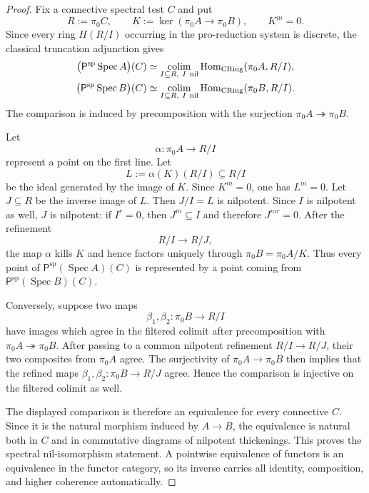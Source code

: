\begin{proof}
Fix a connective spectral test $C$ and put
\[
    R:=\pi_0C,
    \qquad
    K:=\ker(\pi_0A\to\pi_0B),
    \qquad
    K^m=0.
\]
Since every ring $H(R/I)$ occurring in the pro-reduction system is discrete,
the classical truncation adjunction gives
\[
\begin{aligned}
    \bigl(\mathsf P^{\mathrm{sp}}\operatorname{Spec}A\bigr)(C)
    &\simeq
    \operatorname*{colim}_{I\subseteq R,\ I\ {\rm nil}}
    \operatorname{Hom}_{\operatorname{CRing}}
    (\pi_0A,R/I),\\
    \bigl(\mathsf P^{\mathrm{sp}}\operatorname{Spec}B\bigr)(C)
    &\simeq
    \operatorname*{colim}_{I\subseteq R,\ I\ {\rm nil}}
    \operatorname{Hom}_{\operatorname{CRing}}
    (\pi_0B,R/I).
\end{aligned}
\]
The comparison is induced by precomposition with the surjection
$\pi_0A\twoheadrightarrow\pi_0B$.

Let
\[
    \alpha:\pi_0A\longrightarrow R/I
\]
represent a point on the first line.  Let
\[
    L:=\alpha(K)(R/I)\subseteq R/I
\]
be the ideal generated by the image of $K$.  Since $K^m=0$, one has
$L^m=0$.  Let $J\subseteq R$ be the inverse image of $L$.  Then
$J/I=L$ is nilpotent.  Since $I$ is nilpotent as well, $J$ is nilpotent: if
$I^r=0$, then $J^m\subseteq I$ and therefore $J^{mr}=0$.  After the
refinement
\[
    R/I\longrightarrow R/J,
\]
the map $\alpha$ kills $K$ and hence factors uniquely through
$\pi_0B=\pi_0A/K$.  Thus every point of
$\mathsf P^{\mathrm{sp}}(\operatorname{Spec}A)(C)$ is represented by a point
coming from $\mathsf P^{\mathrm{sp}}(\operatorname{Spec}B)(C)$.

Conversely, suppose two maps
\[
    \beta_1,\beta_2:\pi_0B\longrightarrow R/I
\]
have images which agree in the filtered colimit after precomposition with
$\pi_0A\twoheadrightarrow\pi_0B$.  After passing to a common nilpotent
refinement $R/I\to R/J$, their two composites from $\pi_0A$ agree.  The
surjectivity of $\pi_0A\to\pi_0B$ then implies that the refined maps
$\beta_1,\beta_2:\pi_0B\to R/J$ agree.  Hence the comparison is injective on
the filtered colimit as well.

The displayed comparison is therefore an equivalence for every connective
$C$.  Since it is the natural morphism induced by $A\to B$, the equivalence
is natural both in $C$ and in commutative diagrams of nilpotent thickenings.
This proves the spectral nil-isomorphism statement.  A pointwise equivalence
of functors is an equivalence in the functor category, so its inverse carries
all identity, composition, and higher coherence automatically.
\end{proof}

